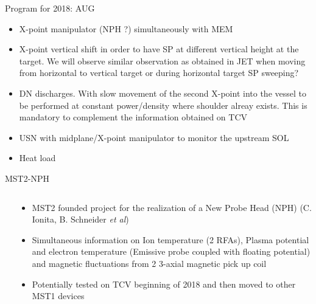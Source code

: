 \documentclass[10pt, compress]{beamer}
\begin{document}
\begin{frame}{Program for 2018: AUG}
  \begin{itemize}
     \item X-point manipulator (NPH ?) simultaneously with MEM
     \item X-point vertical shift in order to have SP at different
	vertical height at the target. \alert{We will observe similar
          observation as obtained in JET when moving from horizontal
          to vertical target or during horizontal target SP sweeping?}
     \item DN discharges. With slow movement of the second X-point into the vessel
	to be performed at constant power/density where shoulder
        alreay exists. \alert{This is mandatory to complement the
          information obtained on TCV}
     \item USN with midplane/X-point manipulator to monitor the
       upstream SOL 
     \item Heat load
\end{itemize}
 \end{frame}
 \begin{frame}{MST2-NPH}
   \begin{columns}
     \begin{column}{0.5\textwidth}
     \end{column}
     \begin{column}{0.5\textwidth}
       \begin{itemize}
         \item MST2 founded project for the realization of a New Probe
           Head (NPH) (C. Ionita,  B. Schneider \textit{et al})
         \item Simultaneous information on Ion temperature (2 RFAs),
           Plasma potential and electron temperature (Emissive probe
           coupled with floating potential) and magnetic fluctuations
           from 2 3-axial magnetic pick up coil
         \item Potentially tested on TCV beginning of 2018 and then
           moved to other MST1 devices
       \end{itemize}
     \end{column}
   \end{columns}
 \end{frame}
 
\end{document}
